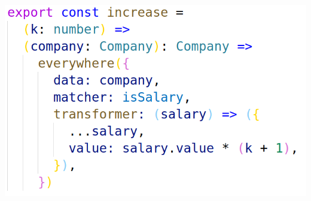 \documentclass[14pt]{beamer}
\begin{document}
\begin{frame}
\begin{columns}
\begin{column}{.5\textwidth}
      \includegraphics[height=0.7\textheight,width=\textwidth,keepaspectratio]{graphics/increase-ts.png}
    \end{column}
  \end{columns}
\end{frame}
\end{document}
